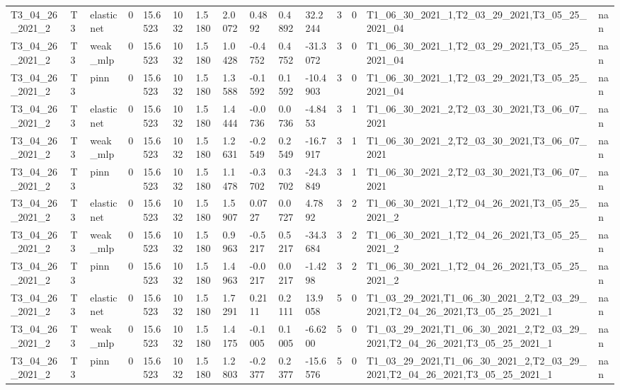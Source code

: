 \begin{table}[t]
\begin{tabular}{lllllllllllllll}
T3\_04\_26\_2021\_2 & T3 & elasticnet & 0 & 15.6523 & 1032 & 1.5180 & 2.0072 & 0.4892 & 0.4892 & 32.2244 & 3 & 0 & T1\_06\_30\_2021\_1,T2\_03\_29\_2021,T3\_05\_25\_2021\_04 & nan \\
T3\_04\_26\_2021\_2 & T3 & weak\_mlp & 0 & 15.6523 & 1032 & 1.5180 & 1.0428 & -0.4752 & 0.4752 & -31.3072 & 3 & 0 & T1\_06\_30\_2021\_1,T2\_03\_29\_2021,T3\_05\_25\_2021\_04 & nan \\
T3\_04\_26\_2021\_2 & T3 & pinn & 0 & 15.6523 & 1032 & 1.5180 & 1.3588 & -0.1592 & 0.1592 & -10.4903 & 3 & 0 & T1\_06\_30\_2021\_1,T2\_03\_29\_2021,T3\_05\_25\_2021\_04 & nan \\
T3\_04\_26\_2021\_2 & T3 & elasticnet & 0 & 15.6523 & 1032 & 1.5180 & 1.4444 & -0.0736 & 0.0736 & -4.8453 & 3 & 1 & T1\_06\_30\_2021\_2,T2\_03\_30\_2021,T3\_06\_07\_2021 & nan \\
T3\_04\_26\_2021\_2 & T3 & weak\_mlp & 0 & 15.6523 & 1032 & 1.5180 & 1.2631 & -0.2549 & 0.2549 & -16.7917 & 3 & 1 & T1\_06\_30\_2021\_2,T2\_03\_30\_2021,T3\_06\_07\_2021 & nan \\
T3\_04\_26\_2021\_2 & T3 & pinn & 0 & 15.6523 & 1032 & 1.5180 & 1.1478 & -0.3702 & 0.3702 & -24.3849 & 3 & 1 & T1\_06\_30\_2021\_2,T2\_03\_30\_2021,T3\_06\_07\_2021 & nan \\
T3\_04\_26\_2021\_2 & T3 & elasticnet & 0 & 15.6523 & 1032 & 1.5180 & 1.5907 & 0.0727 & 0.0727 & 4.7892 & 3 & 2 & T1\_06\_30\_2021\_1,T2\_04\_26\_2021,T3\_05\_25\_2021\_2 & nan \\
T3\_04\_26\_2021\_2 & T3 & weak\_mlp & 0 & 15.6523 & 1032 & 1.5180 & 0.9963 & -0.5217 & 0.5217 & -34.3684 & 3 & 2 & T1\_06\_30\_2021\_1,T2\_04\_26\_2021,T3\_05\_25\_2021\_2 & nan \\
T3\_04\_26\_2021\_2 & T3 & pinn & 0 & 15.6523 & 1032 & 1.5180 & 1.4963 & -0.0217 & 0.0217 & -1.4298 & 3 & 2 & T1\_06\_30\_2021\_1,T2\_04\_26\_2021,T3\_05\_25\_2021\_2 & nan \\
T3\_04\_26\_2021\_2 & T3 & elasticnet & 0 & 15.6523 & 1032 & 1.5180 & 1.7291 & 0.2111 & 0.2111 & 13.9058 & 5 & 0 & T1\_03\_29\_2021,T1\_06\_30\_2021\_2,T2\_03\_29\_2021,T2\_04\_26\_2021,T3\_05\_25\_2021\_1 & nan \\
T3\_04\_26\_2021\_2 & T3 & weak\_mlp & 0 & 15.6523 & 1032 & 1.5180 & 1.4175 & -0.1005 & 0.1005 & -6.6200 & 5 & 0 & T1\_03\_29\_2021,T1\_06\_30\_2021\_2,T2\_03\_29\_2021,T2\_04\_26\_2021,T3\_05\_25\_2021\_1 & nan \\
T3\_04\_26\_2021\_2 & T3 & pinn & 0 & 15.6523 & 1032 & 1.5180 & 1.2803 & -0.2377 & 0.2377 & -15.6576 & 5 & 0 & T1\_03\_29\_2021,T1\_06\_30\_2021\_2,T2\_03\_29\_2021,T2\_04\_26\_2021,T3\_05\_25\_2021\_1 & nan \\

\end{tabular}
\end{table}
